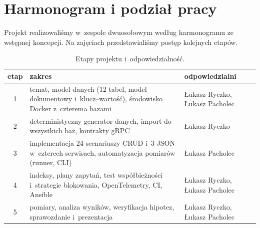 \section{Harmonogram i podział pracy}
\label{sec:harmonogram}

Projekt realizowaliśmy w~zespole dwuosobowym według harmonogramu ze wstępnej
koncepcji. Na zajęciach przedstawialiśmy postęp kolejnych etapów.

\begin{table}[H]
\centering
\small
\caption{Etapy projektu i~odpowiedzialność.}
\begin{tabular}{c>{\raggedright\arraybackslash}p{8.2cm}>{\raggedright\arraybackslash}p{5cm}}
\toprule
etap & zakres & odpowiedzialni \\
\midrule
1 & temat, model danych (12 tabel, model dokumentowy i~klucz--wartość), środowisko Docker z~czterema bazami & Łukasz Ryczko, Łukasz Pacholec \\
2 & deterministyczny generator danych, import do wszystkich baz, kontrakty gRPC & Łukasz Ryczko \\
3 & implementacja 24 scenariuszy CRUD i~3 JSON w~czterech serwisach, automatyzacja pomiarów (runner, CLI) & Łukasz Pacholec \\
4 & indeksy, plany zapytań, test współbieżności i~strategie blokowania, OpenTelemetry, CI, Ansible & Łukasz Ryczko, Łukasz Pacholec \\
5 & pomiary, analiza wyników, weryfikacja hipotez, sprawozdanie i~prezentacja & Łukasz Ryczko, Łukasz Pacholec \\
\bottomrule
\end{tabular}
\end{table}
